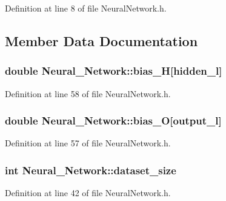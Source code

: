 Definition at line 8 of file Neural\-Network.\-h.



\subsection{Member Data Documentation}
\hypertarget{a00003_a38808438a02d406a7ab54c8bf825752a}{
\subsubsection[{bias\-\_\-\-H}]{\setlength{\rightskip}{0pt plus 5cm}double Neural\-\_\-\-Network\-::bias\-\_\-\-H\mbox{[}{\bf hidden\-\_\-l}\mbox{]}\hspace{0.3cm}{\ttfamily [private]}}}\label{d1/d7c/a00003_a38808438a02d406a7ab54c8bf825752a}


Definition at line 58 of file Neural\-Network.\-h.

\hypertarget{a00003_a8f26363ac0ccda6f04df35e68164cd3a}{
\subsubsection[{bias\-\_\-\-O}]{\setlength{\rightskip}{0pt plus 5cm}double Neural\-\_\-\-Network\-::bias\-\_\-\-O\mbox{[}{\bf output\-\_\-l}\mbox{]}\hspace{0.3cm}{\ttfamily [private]}}}\label{d1/d7c/a00003_a8f26363ac0ccda6f04df35e68164cd3a}


Definition at line 57 of file Neural\-Network.\-h.

\hypertarget{a00003_a8fe39196b36a38696abd679328dd8232}{
\subsubsection[{dataset\-\_\-size}]{\setlength{\rightskip}{0pt plus 5cm}int Neural\-\_\-\-Network\-::dataset\-\_\-size\hspace{0.3cm}{\ttfamily [private]}}}\label{d1/d7c/a00003_a8fe39196b36a38696abd679328dd8232}


Definition at line 42 of file Neural\-Network.\-h.

